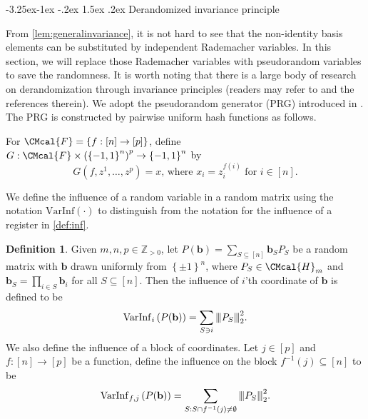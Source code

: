 \documentclass[10pt,a4paper]{article}
\makeatletter
\renewcommand{\subsection}{\@startsection{subsection}{2}{\z@}%
             {-3.25ex\@plus -1ex \@minus -.2ex}%
             {1.5ex \@plus .2ex}%
             {\normalfont\large\scshape\bfseries}}
\def\F{\CMcal{F}}
\def\H{\CMcal{H}}
\theoremstyle{plain}
\theoremstyle{definition}
\newtheorem{definition}[theorem]{Definition}
\newcommand {\set} [1] {\ensuremath{ \left\lbrace #1 \right\rbrace }}
\newcommand {\br} [1] {\ensuremath{ \left( #1 \right) }}
\newcommand{\nnorm}[1]{{\left\vert\kern-0.25ex\left\vert\kern-0.25ex\left\vert #1
		\right\vert\kern-0.25ex\right\vert\kern-0.25ex\right\vert}}
\newcommand{\posint}{{\mathbb Z}_{>0}}
\newcommand{\randb}{\ensuremath{\mathbf{b}}}
\newcommand{\varinfi}[1]{\ensuremath{\mathrm{VarInf}_i}\br{#1}}
\newcommand{\inffj}[1]{\ensuremath{\mathrm{VarInf}_{f,j}}\br{#1}}
\newcommand{\invf}[1]{\ensuremath{f^{-1}\br{#1}}}
\newcommand{\bits}[1]{\ensuremath{\set{-1,1}^{#1}}}
\newcommand{\1}{\mathbb{1}} %
\makeatother
\begin{document}
%
\subsection{Derandomized invariance principle}\label{sec:derandomize}

From \cref{lem:generalinvariance}, it is not hard to see that the non-identity basis elements can be substituted by independent Rademacher variables. In this section, we will replace those Rademacher variables with pseudorandom variables to save the randomness.  It is worth noting that there is a large body of research on derandomization through invariance principles (readers may refer to\cite{10.1145/3460532} and the references therein). We adopt the pseudorandom generator (PRG) introduced in \cite{10.1145/1806689.1806749}. The PRG is constructed by pairwise uniform hash functions as follows.

  For $\F=\set{f: [n]\to[p]}$,
  define $G:\F\times\br{\bits{n}}^p\to\bits{n}$ by 
  \begin{equation}\label{eq:derandomize-G-def}
  G\br{f,z^1,\dots,z^p}=x\text{, where }x_{i}=z^{f(i)}_{i}\text{ for }i\in[n].
  \end{equation}

We define the influence of a random variable in a random matrix using the notation $\mathrm{VarInf}\br{\cdot}$ to distinguish from the notation for the influence of a register in \cref{def:inf}.
\begin{definition}
Given $m,n,p\in\posint$, let $P(\randb)=\sum_{S\subseteq[n]}\randb_SP_S$ be a random matrix with $\randb$ drawn uniformly from $\set{\pm 1}^n$, where $P_S\in\H_m$ and $\randb_S=\prod_{i\in S}\randb_i$ for all $S\subseteq[n]$. Then the influence of $i$'th coordinate of $\randb$ is defined to be
\[\varinfi{P(\randb)}=\sum_{S\ni i}\nnorm{P_S}_2^2.\]
We also define the influence of a block of coordinates.
Let $j\in[p]$ and $f:[n]\to[p]$ be a function, define the influence on the block $f^{-1}(j)\subseteq[n]$ to be
\[\inffj{P(\randb)}=\sum_{S:S\cap \invf{j}\ne\emptyset}\nnorm{P_S}_2^2.\]
\end{definition}
\end{document}
